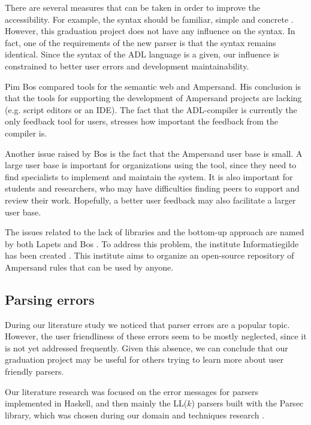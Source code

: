 There are several measures that can be taken in order to improve the accessibility.
For example, the syntax should be familiar, simple and concrete .
However, this graduation project does not have any influence on the syntax.
In fact, one of the requirements of the new parser is that the syntax remains identical.
Since the syntax of the ADL language is a given, our influence is constrained to better user errors and development maintainability.

%
Pim Bos  compared tools for the semantic web and Ampersand.
His conclusion is that the tools for supporting the development of Ampersand projects are lacking (e.g. script editors or an IDE).
The fact that the ADL-compiler is currently the only feedback tool for users, stresses how important the feedback from the compiler is.

Another issue raised by Bos is the fact that the Ampersand user base is small.
A large user base is important for organizations using the tool, since they need to find specialists to implement and maintain the system.
It is also important for students and researchers, who may have difficulties finding peers to support and review their work.
Hopefully, a better user feedback may also facilitate a larger user base.

The issues related to the lack of libraries and the bottom-up approach are named by both Lapets  and Bos .
To address this problem, the institute Informatiegilde has been created .
This institute aims to organize an open-source repository of Ampersand rules that can be used by anyone.

\subsection{Parsing errors}
During our literature study we noticed that parser errors are a popular topic.
However, the user friendliness of these errors seem to be mostly neglected, since it is not yet addressed frequently.
Given this absence, we can conclude that our graduation project may be useful for others trying to learn more about user friendly parsers.

Our literature research was focused on the error messages for parsers implemented in Haskell, and then mainly the LL($k$) parsers built with the Parsec library, which was chosen during our domain and techniques research .

